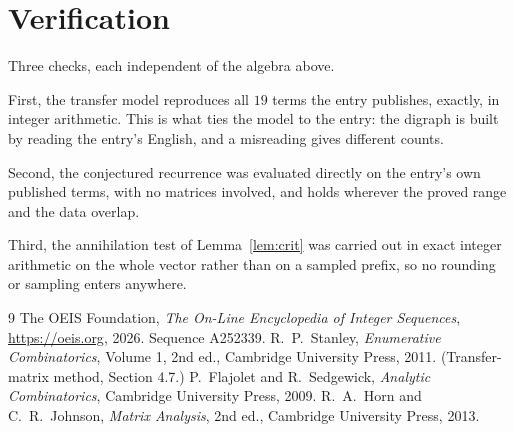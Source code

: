 \documentclass[11pt,a4paper]{article}
\theoremstyle{plain}
\theoremstyle{definition}
\begin{document}
\section{Verification}

Three checks, each independent of the algebra above.

First, the transfer model reproduces all $19$ terms the entry publishes, exactly, in
integer arithmetic. This is what ties the model to the entry: the digraph is built by reading
the entry's English, and a misreading gives different counts.

Second, the conjectured recurrence was evaluated directly on the entry's own published terms,
with no matrices involved, and holds wherever the proved range and the data overlap.

Third, the annihilation test of Lemma~\ref{lem:crit} was carried out in exact integer
arithmetic on the whole vector rather than on a sampled prefix, so no rounding or sampling
enters anywhere.

\begin{thebibliography}{9}
 The OEIS Foundation, \emph{The On-Line Encyclopedia of Integer
Sequences}, \url{https://oeis.org}, 2026. Sequence A252339.
 R.~P.~Stanley, \emph{Enumerative Combinatorics}, Volume 1, 2nd ed.,
Cambridge University Press, 2011. (Transfer-matrix method, Section 4.7.)
 P.~Flajolet and R.~Sedgewick, \emph{Analytic Combinatorics}, Cambridge
University Press, 2009.
 R.~A.~Horn and C.~R.~Johnson, \emph{Matrix Analysis}, 2nd ed., Cambridge
University Press, 2013.
\end{thebibliography}
\end{document}

